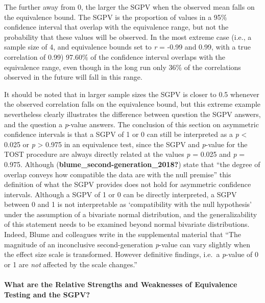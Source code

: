 \documentclass[
  english,
  man]{apa6}
\let\oldparagraph\paragraph
\renewcommand{\paragraph}[1]{\oldparagraph{#1}\mbox{}}
\begin{document}
The further away from 0, the larger the SGPV when the observed mean falls on the equivalence bound. The SGPV is the proportion of values in a 95\(\%\) confidence interval that overlap with the equivalence range, but not the probability that these values will be observed. In the most extreme case (i.e., a sample size of 4, and equivalence bounds set to \emph{r} = -0.99 and 0.99, with a true correlation of 0.99) 97.60\(\%\) of the confidence interval overlaps with the equivalence range, even though in the long run only 36\(\%\) of the correlations observed in the future will fall in this range.

It should be noted that in larger sample sizes the SGPV is closer to 0.5 whenever the observed correlation falls on the equivalence bound, but this extreme example nevertheless clearly illustrates the difference between question the SGPV answers, and the question a \emph{p}-value answers. The conclusion of this section on asymmetric confidence intervals is that a SGPV of 1 or 0 can still be interpreted as a \emph{p} \textless{} 0.025 or \emph{p} \textgreater{} 0.975 in an equivalence test, since the SGPV and \emph{p}-value for the TOST procedure are always directly related at the values \emph{p} = 0.025 and \emph{p} = 0.975. Although (\textbf{blume\_second-generation\_2018?}) state that ``the degree of overlap conveys how compatible the data are with the null premise'' this definition of what the SGPV provides does not hold for asymmetric confidence intervals. Although a SGPV of 1 or 0 can be directly interpreted, a SGPV between 0 and 1 is not interpretable as `compatibility with the null hypothesis' under the assumption of a bivariate normal distribution, and the generalizability of this statement needs to be examined beyond normal bivariate distributions. Indeed, Blume and colleagues write in the supplemental material that ``The magnitude of an inconclusive second-generation \emph{p}-value can vary slightly when the effect size scale is transformed. However definitive findings, i.e.~a \emph{p}-value of 0 or 1 are \emph{not} affected by the scale changes.''

\hypertarget{what-are-the-relative-strengths-and-weaknesses-of-equivalence-testing-and-the-sgpv}{%
\paragraph{What are the Relative Strengths and Weaknesses of Equivalence Testing and the SGPV?}\label{what-are-the-relative-strengths-and-weaknesses-of-equivalence-testing-and-the-sgpv}}
\end{document}
